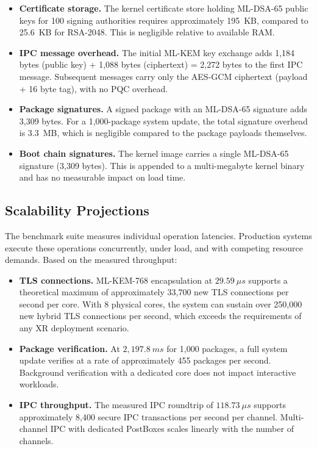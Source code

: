\documentclass[11pt, a4paper]{article}
\begin{document}
\begin{itemize}
    \item \textbf{Certificate storage.} The kernel certificate store holding ML-DSA-65 public keys for 100 signing authorities requires approximately 195~KB, compared to 25.6~KB for RSA-2048. This is negligible relative to available RAM.
    \item \textbf{IPC message overhead.} The initial ML-KEM key exchange adds 1,184 bytes (public key) + 1,088 bytes (ciphertext) = 2,272 bytes to the first IPC message. Subsequent messages carry only the AES-GCM ciphertext (payload + 16 byte tag), with no PQC overhead.
    \item \textbf{Package signatures.} A signed package with an ML-DSA-65 signature adds 3,309 bytes. For a 1,000-package system update, the total signature overhead is 3.3~MB, which is negligible compared to the package payloads themselves.
    \item \textbf{Boot chain signatures.} The kernel image carries a single ML-DSA-65 signature (3,309 bytes). This is appended to a multi-megabyte kernel binary and has no measurable impact on load time.
\end{itemize}

\subsection{Scalability Projections}\label{sec:scalability}

The benchmark suite measures individual operation latencies. Production systems execute these operations concurrently, under load, and with competing resource demands. Based on the measured throughput:

\begin{itemize}
    \item \textbf{TLS connections.} ML-KEM-768 encapsulation at $29.59~\mu s$ supports a theoretical maximum of approximately 33,700 new TLS connections per second per core. With 8 physical cores, the system can sustain over 250,000 new hybrid TLS connections per second, which exceeds the requirements of any XR deployment scenario.
    \item \textbf{Package verification.} At $2,197.8~ms$ for 1,000 packages, a full system update verifies at a rate of approximately 455 packages per second. Background verification with a dedicated core does not impact interactive workloads.
    \item \textbf{IPC throughput.} The measured IPC roundtrip of $118.73~\mu s$ supports approximately 8,400 secure IPC transactions per second per channel. Multi-channel IPC with dedicated PostBoxes scales linearly with the number of channels.
\end{itemize}
\end{document}
